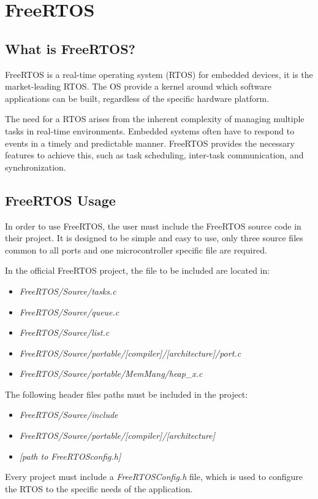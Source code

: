 \section{FreeRTOS}
\subsection{What is FreeRTOS?}
FreeRTOS is a real-time operating system (RTOS) for embedded devices, it is the market-leading RTOS. The OS provide a kernel around which software applications can be built, regardless of the specific hardware platform.

The need for a RTOS arises from the inherent complexity of managing multiple tasks in real-time environments. Embedded systems often have to respond to events in a timely and predictable manner. FreeRTOS provides the necessary features to achieve this, such as task scheduling, inter-task communication, and synchronization.

\subsection{FreeRTOS Usage}
In order to use FreeRTOS, the user must include the FreeRTOS source code in their project. It is designed to be simple and easy to use, only three source files common to all ports and one microcontroller specific file are required.

In the official FreeRTOS project, the file to be included are located in:

\begin{itemize}
    \item \textit{FreeRTOS/Source/tasks.c}
    \item \textit{FreeRTOS/Source/queue.c}
    \item \textit{FreeRTOS/Source/list.c}
    \item \textit{FreeRTOS/Source/portable/[compiler]/[architecture]/port.c}
    \item \textit{FreeRTOS/Source/portable/MemMang/heap\_x.c}
\end{itemize}

The following header files paths must be included in the project:

\begin{itemize}
    \item \textit{FreeRTOS/Source/include}
    \item \textit{FreeRTOS/Source/portable/[compiler]/[architecture]}
    \item \textit{[path to FreeRTOSconfig.h]}
\end{itemize}

Every project must include a \textit{FreeRTOSConfig.h} file, which is used to configure the RTOS to the specific needs of the application.